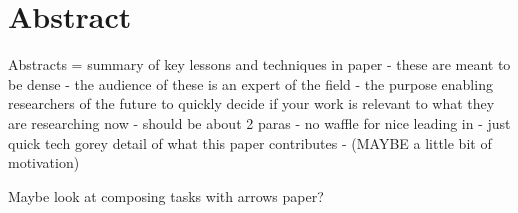 \documentclass[dissertation.tex]{subfiles}
\begin{document}
\chapter*{Abstract}\label{chap:abstract}

Abstracts = summary of key lessons and techniques in paper
 - these are meant to be dense
 - the audience of these is an expert of the field
 - the purpose enabling researchers of the future to quickly decide if your work is relevant to what they are researching now
 - should be about 2 paras - no waffle for nice leading in
 - just quick tech gorey detail of what this paper contributes
 - (MAYBE a little bit of motivation)

 Maybe look at composing tasks with arrows paper?
\end{document}
